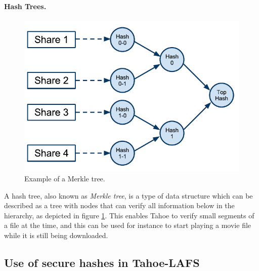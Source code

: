 \documentclass[english,12pt,a4paper]{book}
\begin{document}
\paragraph{Hash Trees.}

\begin{figure}[h]
    \centering
    \includegraphics[width=0.9\columnwidth]{Tahoe-MerkleTree.pdf}
    \caption{Example of a Merkle tree.}
    \label{fig:tahoemerkletree}
\end{figure}

A hash tree, also known as \emph{Merkle tree}, is a type of data structure
which can be described as a tree with nodes that can verify all information
below in the hierarchy, as depicted in figure \ref{fig:tahoemerkletree}. This
enables Tahoe to verify small segments of a file at the time, and this can be
used for instance to start playing a movie file while it is still being
downloaded.


\subsection{Use of secure hashes in Tahoe-LAFS}
\end{document}
